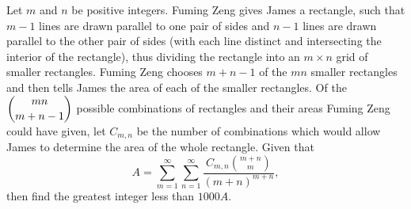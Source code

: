 Let $m$ and $n$ be positive integers. Fuming Zeng gives James a rectangle, such that $m-1$ lines are drawn parallel to one pair of sides and $n-1$ lines are drawn parallel to the other pair of sides (with each line distinct and intersecting the interior of the rectangle), thus dividing the rectangle into an $m\times n$ grid of smaller rectangles. Fuming Zeng chooses $m+n-1$ of the $mn$ smaller rectangles and then tells James the area of each of the smaller rectangles. Of the $\dbinom{mn}{m+n-1}$ possible combinations of rectangles and their areas Fuming Zeng could have given, let $C_{m,n}$ be the number of combinations which would allow James to determine the area of the whole rectangle. Given that \[A=\sum_{m=1}^\infty \sum_{n=1}^\infty \frac{C_{m,n}\binom{m+n}{m}}{(m+n)^{m+n}},\] then find the greatest integer less than $1000A$.
